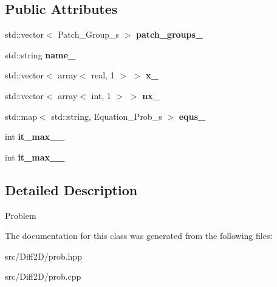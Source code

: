 \subsection*{Public Attributes}
\begin{DoxyCompactItemize}
\item 
\hypertarget{classProb_a63da8c35707c884a7f2960b18e8b5e30}{
std::vector$<$ Patch\_\-Group\_\-s $>$ {\bfseries patch\_\-groups\_\-}}
\label{classProb_a63da8c35707c884a7f2960b18e8b5e30}

\item 
\hypertarget{classProb_af34172c6eced00a603e92e0cf17e4953}{
std::string {\bfseries name\_\-}}
\label{classProb_af34172c6eced00a603e92e0cf17e4953}

\item 
\hypertarget{classProb_ac18ce288649f196b15137b88bfe374de}{
std::vector$<$ array$<$ real, 1 $>$ $>$ {\bfseries x\_\-}}
\label{classProb_ac18ce288649f196b15137b88bfe374de}

\item 
\hypertarget{classProb_a663e2f9aca6788b1dc06c3ff468b3e55}{
std::vector$<$ array$<$ int, 1 $>$ $>$ {\bfseries nx\_\-}}
\label{classProb_a663e2f9aca6788b1dc06c3ff468b3e55}

\item 
\hypertarget{classProb_ac78ec4ce0542942cbfdb62e2737b149e}{
std::map$<$ std::string, Equation\_\-Prob\_\-s $>$ {\bfseries equs\_\-}}
\label{classProb_ac78ec4ce0542942cbfdb62e2737b149e}

\item 
\hypertarget{classProb_ab683dae1ead4955162ebe4a2194f8a35}{
int {\bfseries it\_\-max\_\_\-}}
\label{classProb_ab683dae1ead4955162ebe4a2194f8a35}

\item 
\hypertarget{classProb_ac344ce6492eb0d3f8b6655aa914982d7}{
int {\bfseries it\_\-max\_\_\-}}
\label{classProb_ac344ce6492eb0d3f8b6655aa914982d7}

\end{DoxyCompactItemize}


\subsection{Detailed Description}
Problem 

The documentation for this class was generated from the following files:\begin{DoxyCompactItemize}
\item 
src/Diff2D/prob.hpp\item 
src/Diff2D/prob.cpp\end{DoxyCompactItemize}
